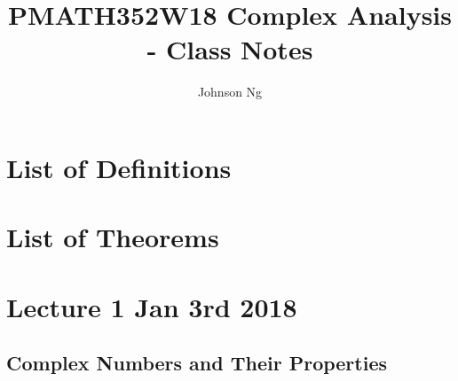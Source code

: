 \documentclass[11pt, oneside]{book}
\title{PMATH352W18 Complex Analysis - Class Notes}
\author{Johnson Ng}
\begin{document}
\hypersetup{pageanchor=false}
\maketitle
\hypersetup{pageanchor=true}
\tableofcontents

\chapter*{List of Definitions}

\chapter*{List of Theorems}

\chapter{Lecture 1 Jan 3rd 2018}
	\label{chapter:lecture_1_jan_3rd_2018}

\section{Complex Numbers and Their Properties} %
\label{sec:complex_numbers_and_their_properties}
\end{document}
